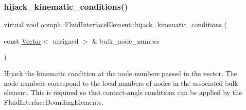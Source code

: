 \mbox{\label{classoomph_1_1FluidInterfaceElement_a7eb949642baee233779e4f92478ea341}} 
\subsubsection{\texorpdfstring{hijack\+\_\+kinematic\+\_\+conditions()}{hijack\_kinematic\_conditions()}}
{\footnotesize\ttfamily virtual void oomph\+::\+Fluid\+Interface\+Element\+::hijack\+\_\+kinematic\+\_\+conditions (\begin{DoxyParamCaption}\item[{const \hyperlink{classoomph_1_1Vector}{Vector}$<$ unsigned $>$ \&}]{bulk\+\_\+node\+\_\+number }\end{DoxyParamCaption})\hspace{0.3cm}{\ttfamily [pure virtual]}}



Hijack the kinematic condition at the node numbers passed in the vector. The node numbers correspond to the local numbers of nodes in the associated bulk element. This is required so that contact-\/angle conditions can be applied by the Fluid\+Interface\+Bounding\+Elements. 




